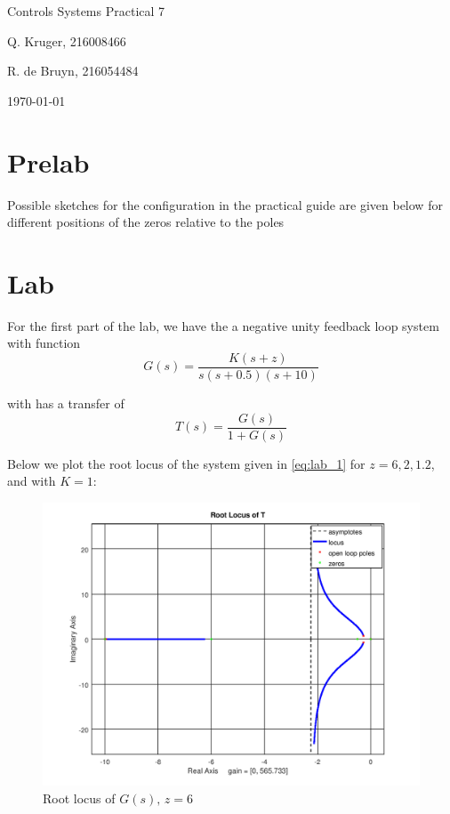 \documentclass[12pt, a4paper]{article}
\begin{document}
		\begin{titlepage}
			\centering
			{\LARGE Controls Systems Practical 7\par}
			\vspace*{1.5cm}
			{\large Q. Kruger, 216008466 \par}
			{\large R. de Bruyn, 216054484 \par}
			\vspace*{1.2cm}
			{\large \today}
			\vspace*{\fill}
			\vspace*{\fill}
		\end{titlepage}

	\tableofcontents
	\listoffigures
	\newpage

	\section{Prelab} %
	\label{sec:prelab}
		Possible sketches for the configuration in the practical guide are given below for different positions of the zeros relative to the poles
		

	\section{Lab} %
	\label{sec:lab}
		For the first part of the lab, we have the a negative unity feedback loop system with function
		\begin{equation}
			G(s) = \frac{K(s+z)}{s(s+0.5)(s+10)}
			\label{eq:lab_1}
		\end{equation}

		\noindent with has a transfer of
		\begin{equation}
			T(s) = \frac{G(s)}{1 + G(s)}
			\label{eq:ts}
		\end{equation}

		Below we plot the root locus of the system given in \eqref{eq:lab_1} for $z=6,2,1.2$, and with $K=1$:

		\begin{figure}[H]
			\centering
			\includegraphics[width=.8\textwidth]{img/rlocus_1.png}
			\caption{Root locus of $G(s),\,z=6$}
			\label{fig:fig_1}
		\end{figure}
\end{document}
